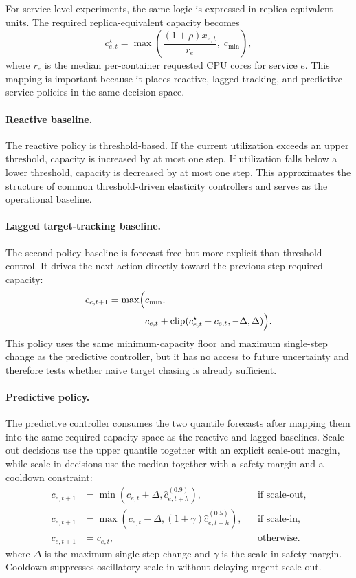 For service-level experiments, the same logic is expressed in replica-equivalent units. The required replica-equivalent capacity becomes
\[
c^\star_{e,t} = \max\left(\frac{(1+\rho)x_{e,t}}{r_e},\; c_{\min}\right),
\]
where $r_e$ is the median per-container requested CPU cores for service $e$.
This mapping is important because it places reactive, lagged-tracking, and predictive service policies in the same decision space.

\paragraph{Reactive baseline.}
The reactive policy is threshold-based. If the current utilization exceeds an upper threshold, capacity is increased by at most one step. If utilization falls below a lower threshold, capacity is decreased by at most one step. This approximates the structure of common threshold-driven elasticity controllers and serves as the operational baseline.

\paragraph{Lagged target-tracking baseline.}
The second policy baseline is forecast-free but more explicit than threshold control. It drives the next action directly toward the previous-step required capacity:
\[
\begin{aligned}
c_{e,t+1} = \max\Bigl(&c_{\min},\\
&c_{e,t} + \mathrm{clip}(c^\star_{e,t} - c_{e,t}, -\Delta, \Delta)\Bigr).
\end{aligned}
\]
This policy uses the same minimum-capacity floor and maximum single-step change as the predictive controller, but it has no access to future uncertainty and therefore tests whether naive target chasing is already sufficient.

\paragraph{Predictive policy.}
The predictive controller consumes the two quantile forecasts after mapping them into the same required-capacity space as the reactive and lagged baselines. Scale-out decisions use the upper quantile together with an explicit scale-out margin, while scale-in decisions use the median together with a safety margin and a cooldown constraint:
{\small
\[
\begin{aligned}
c_{e,t+1} &= \min(c_{e,t} + \Delta, \hat{c}^{(0.9)}_{e,t+h}),
&& \text{if scale-out},\\
c_{e,t+1} &= \max(c_{e,t} - \Delta,
  (1+\gamma)\hat{c}^{(0.5)}_{e,t+h}),
&& \text{if scale-in},\\
c_{e,t+1} &= c_{e,t},
&& \text{otherwise}.
\end{aligned}
\]
}
where $\Delta$ is the maximum single-step change and $\gamma$ is the scale-in safety margin. Cooldown suppresses oscillatory scale-in without delaying urgent scale-out.

